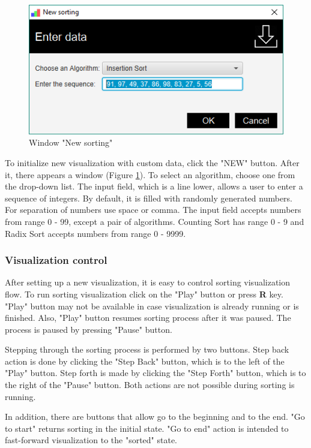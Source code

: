 \documentclass[
  field=inf,
  biblatex,
  language=english,
  glossaries,
  theorems=false,
  sourcecodes=false,
  index
]{kidiplom}
\begin{document}
\begin{figure}[H]
\begin{center}
	\includegraphics[scale=0.5]{img/ui/WindowNew.png}
	\caption{Window "New sorting"}\label{fig:new}
\end{center}
\end{figure}

To initialize new visualization with custom data, click the "NEW" button. After it, there appears a window (Figure \ref{fig:new}). To select an algorithm, choose one from the drop-down list. The input field, which is a line lower, allows a user to enter a sequence of integers. By default, it is filled with randomly generated numbers. For separation of numbers use space or comma. The input field accepts numbers from range 0 - 99, except a pair of algorithms. Counting Sort has range 0 - 9 and Radix Sort accepts numbers from range 0 - 9999. 

\subsubsection{Visualization control}

After setting up a new visualization, it is easy to control sorting visualization flow. To run sorting visualization click on the "Play" button or press \textbf{R} key. "Play" button may not be available in case visualization is already running or is finished. Also, "Play" button resumes sorting process after it was paused. The process is paused by pressing "Pause" button.

Stepping through the sorting process is performed by two buttons. Step back action is done by clicking the "Step Back" button, which is to the left of the "Play" button. Step forth is made by clicking the "Step Forth" button, which is to the right of the "Pause" button. Both actions are not possible during sorting is running.

In addition, there are buttons that allow go to the beginning and to the end. "Go to start" returns sorting in the initial state. "Go to end" action is intended to fast-forward visualization to the "sorted" state.
\end{document}
